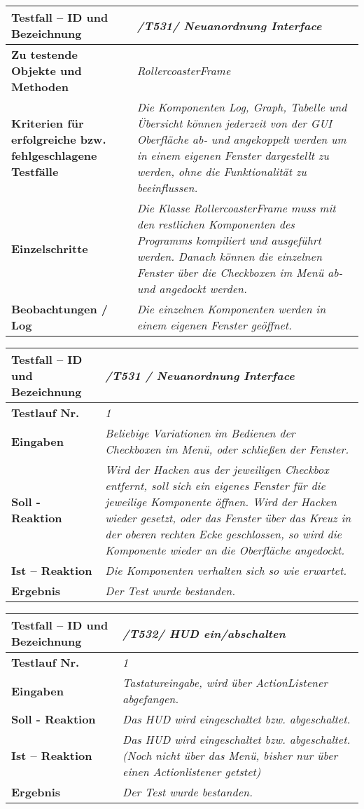 \begin{longtable}{|p{7cm}|p{10cm}|}
\hline
\textbf{Testfall -- ID und Bezeichnung} &  \textit{/T531/ Neuanordnung Interface} \\
\hline
\textbf{Zu testende Objekte und Methoden} &  \textit{RollercoasterFrame}
\\
\hline
\textbf{Kriterien für erfolgreiche bzw. fehlgeschlagene Testfälle} &
\textit{Die Komponenten Log, Graph, Tabelle und Übersicht können jederzeit von der GUI Oberfläche ab- und angekoppelt werden um in einem eigenen Fenster dargestellt zu werden, ohne die Funktionalität zu beeinflussen.} \\
\hline
\textbf{Einzelschritte} &  \textit{Die Klasse RollercoasterFrame muss mit den restlichen Komponenten des Programms kompiliert und ausgeführt werden. Danach können die einzelnen Fenster über
die Checkboxen im Menü ab- und angedockt werden.} \\
\hline
\textbf{Beobachtungen / Log} &  \textit{Die einzelnen Komponenten werden in einem eigenen Fenster geöffnet.} \\
\hline
\end{longtable}

\begin{longtable}{|p{7cm}|p{10cm}|}
\hline
\textbf{Testfall -- ID und Bezeichnung} & \textit{ /T531 / Neuanordnung Interface} \\
\hline
\textbf{Testlauf Nr.} & \textit{1} \\
\hline
\textbf{Eingaben} & \textit{Beliebige Variationen im Bedienen der Checkboxen im Menü, oder schließen der Fenster.} \\
\hline
\textbf{Soll - Reaktion} & \textit{Wird der Hacken aus der jeweiligen Checkbox entfernt, soll sich ein eigenes Fenster für die jeweilige Komponente öffnen. Wird der Hacken wieder gesetzt, 
oder das Fenster über das Kreuz in der oberen rechten Ecke geschlossen, so wird die Komponente wieder an die Oberfläche angedockt.} \\
\hline
\textbf{Ist -- Reaktion} & \textit{Die Komponenten verhalten sich so wie erwartet.} \\
\hline
\textbf{Ergebnis} & \textit{Der Test wurde bestanden.} \\
\hline
\end{longtable}

\begin{longtable}{|p{7cm}|p{10cm}|}
\hline
\textbf{Testfall -- ID und Bezeichnung} & \textit{/T532/ HUD ein/abschalten} \\
\hline
\textbf{Testlauf Nr.} & \textit{1} \\
\hline
\textbf{Eingaben} & \textit{Tastatureingabe, wird über ActionListener abgefangen.} \\
\hline
\textbf{Soll - Reaktion} & \textit{Das HUD wird eingeschaltet bzw. abgeschaltet.} \\
\hline
\textbf{Ist -- Reaktion} & \textit{Das HUD wird eingeschaltet bzw. abgeschaltet.(Noch nicht über das Menü, bisher nur über einen Actionlistener getstet)} \\
\hline
\textbf{Ergebnis} & \textit{Der Test wurde bestanden.} \\
\hline
\end{longtable}

